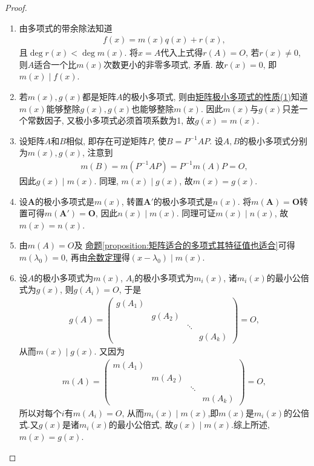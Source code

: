 \documentclass[../../main.tex]{subfiles}%
\begin{document}
\begin{proof}
\begin{enumerate}[(1)]
\item 由多项式的带余除法知道
\begin{align*}
f(x) = m(x)q(x) + r(x),
\end{align*}
且$\deg r(x) < \deg m(x)$. 将$x = A$代入上式得$r(A) = O$, 若$r(x) \neq 0$, 则$A$适合一个比$m(x)$次数更小的非零多项式, 矛盾. 故$r(x) = 0$, 即$m(x) \mid f(x)$.

\item 若$m(x), g(x)$都是矩阵$A$的极小多项式, 则由\hyperref[proposition:极小多项式的性质]{矩阵极小多项式的性质(1)}知道$m(x)$能够整除$g(x), g(x)$也能够整除$m(x)$. 因此$m(x)$与$g(x)$只差一个常数因子, 又极小多项式必须首项系数为1, 故$g(x) = m(x)$.

\item 设矩阵$A$和$B$相似, 即存在可逆矩阵$P$, 使$B = P^{-1}AP$. 设$A, B$的极小多项式分别为$m(x), g(x)$, 注意到
\begin{align*}
m(B) = m(P^{-1}AP) = P^{-1}m(A)P = O,
\end{align*}
因此$g(x) \mid m(x)$. 同理, $m(x) \mid g(x)$, 故$m(x) = g(x)$.

\item 设\(\boldsymbol{A}\)的极小多项式是\(m(x)\), 转置\(\boldsymbol{A}'\)的极小多项式是\(n(x)\). 将\(m(\boldsymbol{A}) = \boldsymbol{O}\)转置可得\(m(\boldsymbol{A}') = \boldsymbol{O}\), 因此\(n(x)\mid m(x)\). 同理可证\(m(x)\mid n(x)\), 故\(m(x) = n(x)\).

\item 由$m(A) = O$及
\hyperref[proposition:矩阵适合的多项式其特征值也适合]{命题\ref{proposition:矩阵适合的多项式其特征值也适合}}可得$m(\lambda_0) = 0$, 再由\hyperref[theorem:余数定理]{余数定理}得$(x - \lambda_0) \mid m(x)$.

\item 设$A$的极小多项式为$m(x)$, $A_i$的极小多项式为$m_i(x)$, 诸$m_i(x)$的最小公倍式为$g(x)$, 则$g(A_i) = O$, 于是
\begin{align*}
g(A) = \begin{pmatrix}
g(A_1) & & \\
& g(A_2) & \\
& & \ddots & \\
& & & g(A_k)
\end{pmatrix} = O,
\end{align*}
从而$m(x) \mid g(x)$. 又因为
\begin{align*}
m(A) = \begin{pmatrix}
m(A_1) & & \\
& m(A_2) & \\
& & \ddots & \\
& & & m(A_k)
\end{pmatrix} = O,
\end{align*}
所以对每个$i$有$m(A_i) = O$, 从而$m_i(x) \mid m(x)$,即$m(x)$是$m_i(x)$的公倍式.又$g(x)$是诸$m_i(x)$的最小公倍式, 故$g(x) \mid m(x)$.综上所述,$m(x) = g(x)$.
\end{enumerate}

\end{proof}
\end{document}

